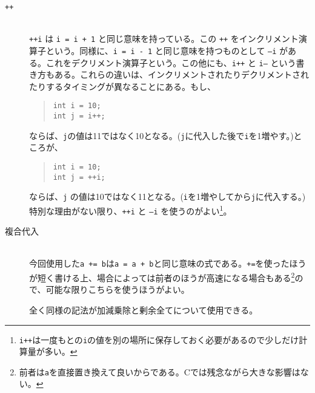 \begin{description}
    \item[\texttt{++}]\mbox{}\\
          \texttt{++i} は \texttt{i = i + 1} と同じ意味を持っている。この \texttt{++} をインクリメント演算子という。同様に、\texttt{i = i - 1} と同じ意味を持つものとして \texttt{--i} がある。これをデクリメント演算子という。この他にも、\texttt{i++} と \texttt{i--} という書き方もある。これらの違いは、インクリメントされたりデクリメントされたりするタイミングが異なることにある。もし、
          \begin{quote}
              \begin{verbatim}
int i = 10;
int j = i++;
\end{verbatim}
          \end{quote}
          ならば、\texttt{j}の値は11ではなく10となる。(\texttt{j}に代入した後で\texttt{i}を1増やす。)ところが、
          \begin{quote}
              \begin{verbatim}
int i = 10;
int j = ++i;
\end{verbatim}
          \end{quote}
          ならば、\texttt{j} の値は10ではなく11となる。(\texttt{i}を1増やしてから\texttt{j}に代入する。)
          特別な理由がない限り、\texttt{++i} と \texttt{--i} を使うのがよい\footnote{\texttt{i++}は一度もとの\texttt{i}の値を別の場所に保存しておく必要があるので少しだけ計算量が多い。}。
    \item[複合代入]\mbox{}\\
          今回使用した\texttt{a += b}は\texttt{a = a + b}と同じ意味の式である。\texttt{+=}を使ったほうが短く書ける上、場合によっては前者のほうが高速になる場合もある\footnote{前者は\texttt{a}を直接置き換えて良いからである。Cでは残念ながら大きな影響はない。}ので、可能な限りこちらを使うほうがよい。

          全く同様の記法が加減乗除と剰余全てについて使用できる。
\end{description}



